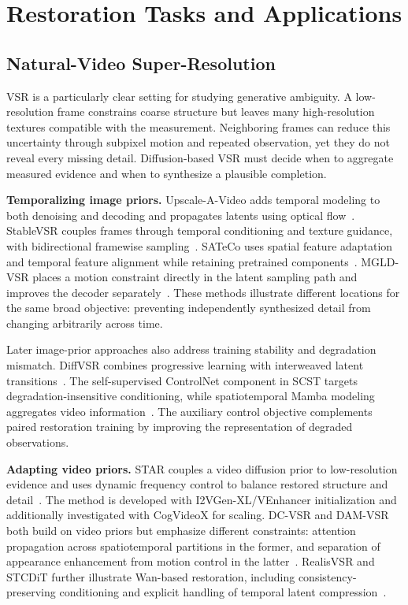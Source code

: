 \section{Restoration Tasks and Applications}
\label{sec:tasks}
\subsection{Natural-Video Super-Resolution}
VSR is a particularly clear setting for studying generative ambiguity. A low-resolution frame constrains coarse structure but leaves many high-resolution textures compatible with the measurement. Neighboring frames can reduce this uncertainty through subpixel motion and repeated observation, yet they do not reveal every missing detail. Diffusion-based VSR must decide when to aggregate measured evidence and when to synthesize a plausible completion.

\textbf{Temporalizing image priors.} Upscale-A-Video adds temporal modeling to both denoising and decoding and propagates latents using optical flow~\cite{upscale}. StableVSR couples frames through temporal conditioning and texture guidance, with bidirectional framewise sampling~\cite{stablevsr}. SATeCo uses spatial feature adaptation and temporal feature alignment while retaining pretrained components~\cite{sateco}. MGLD-VSR places a motion constraint directly in the latent sampling path and improves the decoder separately~\cite{mgld}. These methods illustrate different locations for the same broad objective: preventing independently synthesized detail from changing arbitrarily across time.

Later image-prior approaches also address training stability and degradation mismatch. DiffVSR combines progressive learning with interweaved latent transitions~\cite{diffvsr}. The self-supervised ControlNet component in SCST targets degradation-insensitive conditioning, while spatiotemporal Mamba modeling aggregates video information~\cite{scst}. The auxiliary control objective complements paired restoration training by improving the representation of degraded observations.

\textbf{Adapting video priors.} STAR couples a video diffusion prior to low-resolution evidence and uses dynamic frequency control to balance restored structure and detail~\cite{star}. The method is developed with I2VGen-XL/VEnhancer initialization and additionally investigated with CogVideoX for scaling. DC-VSR and DAM-VSR both build on video priors but emphasize different constraints: attention propagation across spatiotemporal partitions in the former, and separation of appearance enhancement from motion control in the latter~\cite{dcvsr,damvsr}. RealisVSR and STCDiT further illustrate Wan-based restoration, including consistency-preserving conditioning and explicit handling of temporal latent compression~\cite{realis,stcdit}.

